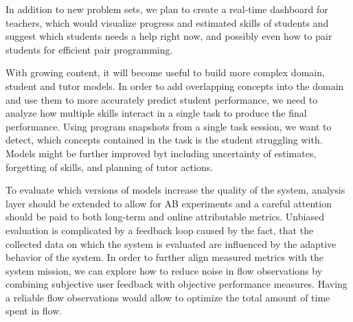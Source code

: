In addition to new problem sets, we plan to create a real-time dashboard for teachers,
which would visualize progress and estimated skills of students and suggest
which students needs a help right now, and possibly even how to pair students
for efficient pair programming.

With growing content, it will become useful to build more complex
domain, student and tutor models. In order to add overlapping concepts
into the domain and use them to more accurately predict student performance,
we need to analyze how multiple skills interact in a single
task to produce the final performance. %
Using program snapshots from a single task session,
we want to detect, which concepts contained in the task
is the student struggling with.
Models might be further improved byt including uncertainty of estimates,
forgetting of skills, and planning of tutor actions.

To evaluate which versions of models increase the quality of the system,
analysis layer should be extended to allow for AB experiments
and a careful attention should be paid to both long-term and
online attributable metrics.
Unbiased evaluation is complicated by a feedback loop caused by the fact, that
the collected data on which the system is evaluated are influenced by the
adaptive behavior of the system.
In order to further align measured metrics with the system mission,
we can explore how to reduce noise in flow observations
by combining subjective user feedback with objective performance measures.
Having a reliable flow observations would allow to optimize the total
amount of time spent in flow.

